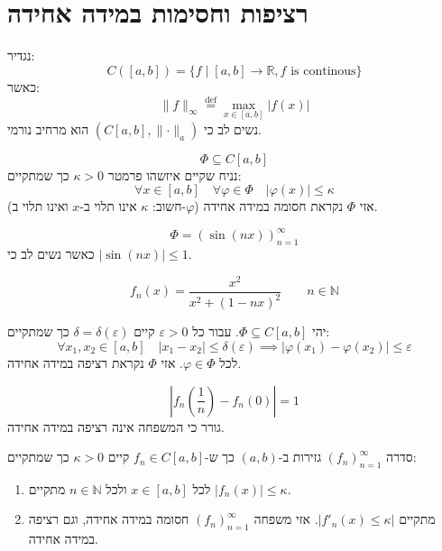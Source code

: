 \documentclass{tstextbook}
\begin{document}
\section{רציפות וחסימות במידה אחידה}

\begin{definition}
נגדיר:
$$C([a,b])=\{ f\mid [a,b]\to \mathbb{R}, f \text{ is continous} \}$$
כאשר:
$$\lVert f \rVert _{\infty} \overset{\text{def}}{=} \max _{x \in [a,b]} \lvert f(x) \rvert $$
נשים לב כי \((C[a,b],\lVert \cdot \rVert_{a})\) הוא מרחיב נורמי.

\end{definition}
\begin{definition}
$$\Phi \subseteq C[a,b]$$
נניח שקיים איזשהו פרמטר \(\kappa > 0\) כך שמתקיים:
$$\forall x \in [a,b]\quad \forall \varphi \in \Phi \quad \lvert \varphi(x) \rvert \leq \kappa$$
(חשוב: \(\kappa\) אינו תלוי ב-\(x\) ואינו תלוי ב-\(\varphi\)) אזי \(\Phi\) נקראת חסומה במידה אחידה.

\end{definition}
\begin{example}
$$\Phi=(\sin(nx))_{n=1}^{\infty}$$
כאשר נשים לב כי \(\lvert \sin(nx) \rvert\leq 1\).

\end{example}
\begin{example}
$$f_{n}(x)= \frac{x^{2}}{x^{2}+(1-nx)^{2}}\qquad  n \in \mathbb{N}$$

\end{example}
\begin{definition}
יהי \(\Phi \subseteq C[a,b]\). עבור כל \(\varepsilon > 0\) קיים \(\delta=\delta(\varepsilon)\) כך שמתקיים:
$$\forall x_{1},x_{2} \in [a,b]\quad \lvert x_{1}-x_{2} \rvert \leq  \delta(\varepsilon)\implies \lvert \varphi(x_{1})-\varphi(x_{2}) \rvert \leq  \varepsilon$$
לכל \(\varphi \in \Phi\). אזי \(\Phi\) נקראת רציפה במידה אחידה.

\end{definition}
\begin{example}
$$\left\lvert  f_{n}\left( \frac{1}{n} \right)-f_{n}(0)  \right\rvert =1$$
גורר כי המשפחה אינה רציפה במידה אחידה.

\end{example}
\begin{example}
סדרה \((f_{n})_{n=1}^{\infty}\) גזירות ב-\((a,b)\) כך ש-\(f_{n}\in C[a,b]\) קיים \(\kappa > 0\) כך שמתקיים:

  \begin{enumerate}
    \item לכל \(x \in [a,b]\) ולכל \(n \in \mathbb{N}\) מתקיים \(\lvert f_{n}(x) \rvert\leq \kappa\). 


    \item מתקיים \(\lvert f'_{n}(x)\leq \kappa \rvert\). 
אזי משפחה \((f_{n})_{n=1}^{\infty}\) חסומה במידה אחידה, וגם רציפה במידה אחידה.


  \end{enumerate}
\end{example}
\end{document}
